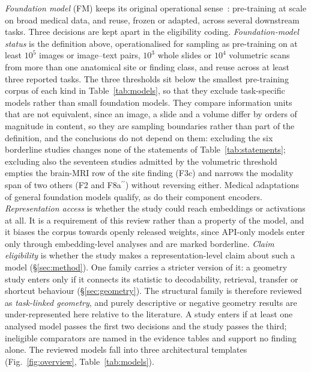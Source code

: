 \emph{Foundation model} (FM) keeps its original operational sense~\cite{bommasani2021opportunities,moor2023generalist}:
pre-training at scale on broad medical data, and reuse, frozen or adapted, across several downstream
tasks. Three decisions are kept apart in the eligibility coding. \emph{Foundation-model status} is the
definition above, operationalised for sampling as pre-training on at least $10^{5}$ images or image--text
pairs, $10^{3}$ whole slides or $10^{4}$ volumetric scans from more than one anatomical site or finding
class, and reuse across at least three reported tasks. The three thresholds sit below the smallest
pre-training corpus of each kind in Table~\ref{tab:models}, so that they exclude task-specific models
rather than small foundation models. They compare information units that are not equivalent, since an
image, a slide and a volume differ by orders of magnitude in content, so they are sampling boundaries
rather than part of the definition, and the conclusions do not depend on them: excluding the six
borderline studies changes none of the statements of Table~\ref{tab:statements}; excluding also the
seventeen studies admitted by the volumetric threshold empties the brain-MRI row of the site finding
(F3c) and narrows the modality span of two others (F2 and F8a$^{\prime\prime}$) without reversing
either. Medical adaptations of general foundation models qualify, as do their component encoders.
\emph{Representation access} is whether the study could reach embeddings or activations at all. It is a
requirement of this review rather than a property of the model, and it biases the corpus towards openly
released weights, since API-only models enter only through embedding-level analyses and are marked
borderline. \emph{Claim eligibility} is whether the study makes a representation-level claim about such
a model (\S\ref{sec:method}). One family carries a stricter version of it: a geometry study enters only
if it connects its statistic to decodability, retrieval, transfer or shortcut behaviour
(\S\ref{sec:geometry}). The structural family is therefore reviewed as \emph{task-linked geometry}, and
purely descriptive or negative geometry results are under-represented here relative to the literature. A
study enters if at least one analysed model passes the first two decisions and the study passes the
third; ineligible comparators are named in the evidence tables and support no finding alone. The
reviewed models fall into three architectural templates (Fig.~\ref{fig:overview}, Table~\ref{tab:models}).


